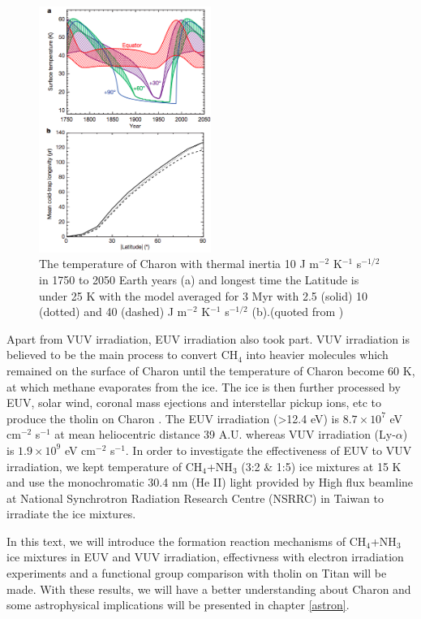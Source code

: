 \begin{figure}
\centering
\includegraphics[width=0.5\textwidth]{figures/chapter1/thermal.png}
\caption{The temperature of Charon with thermal inertia 10 J m$^{-2}$ K$^{-1}$ s$^{-1/2}$ in 1750 to 2050 Earth years (a) and longest time the Latitude is under 25 K with the model averaged for 3 Myr with 2.5 (solid) 10 (dotted) and 40 (dashed) J m$^{-2}$ K$^{-1}$ s$^{-1/2}$ (b).(quoted from \cite{grundy2016formation})}
\label{fig:Charon_thermal}
\end{figure}

Apart from VUV irradiation, EUV irradiation also took part. VUV irradiation is believed to be the main process to convert CH$_4$ into heavier molecules which remained on the surface of Charon until the temperature of Charon become 60 K, at which methane evaporates from the ice. The ice is then further processed by EUV, solar wind, coronal mass ejections and interstellar pickup ions, etc to produce the tholin on Charon \cite{grundy2016formation}. The EUV irradiation (>12.4 eV) is $8.7 \times 10^7$ eV cm$^{-2}$ s$^{-1}$ at mean heliocentric distance 39 A.U. whereas VUV irradiation (Ly-$\alpha$) is $1.9 \times 10^9$ eV cm$^{-2}$ s$^{-1}$\cite{grundy2016formation}. In order to investigate the effectiveness of EUV to VUV irradiation, we kept temperature of CH$_4$+NH$_3$ (3:2 \& 1:5) ice mixtures at 15 K and use the monochromatic 30.4 nm (He II) light provided by High flux beamline at National Synchrotron Radiation Research Centre (NSRRC) in Taiwan to irradiate the ice mixtures.

In this text, we will introduce the formation reaction mechanisms of CH$_4$+NH$_3$ ice mixtures in EUV and VUV irradiation, effectivness with electron irradiation experiments and a functional group comparison with tholin on Titan will be made. With these results, we will have a better understanding about Charon and some astrophysical implications will be presented in chapter \ref{astron}.
